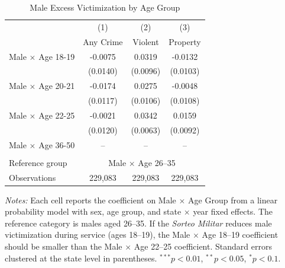\begin{table}[t]\begin{threeparttable}
\centering
\caption{Male Excess Victimization by Age Group}
\label{tab:age_profile}
\begin{tabular}{lccc}
\hline\hline
 & (1) & (2) & (3) \\
 & Any Crime & Violent & Property \\
\hline
\addlinespace
Male $\times$ Age 18-19 & -0.0075 & 0.0319 & -0.0132 \\
 & (0.0140) & (0.0096) & (0.0103) \\
\addlinespace
Male $\times$ Age 20-21 & -0.0174 & 0.0275 & -0.0048 \\
 & (0.0117) & (0.0106) & (0.0108) \\
\addlinespace
Male $\times$ Age 22-25 & -0.0021 & 0.0342 & 0.0159 \\
 & (0.0120) & (0.0063) & (0.0092) \\
\addlinespace
Male $\times$ Age 36-50 & -- & -- & -- \\
 &  &  &  \\
\addlinespace
Reference group & \multicolumn{3}{c}{Male $\times$ Age 26--35} \\
Observations & 229,083 & 229,083 & 229,083 \\
\hline\hline
\end{tabular}
\vspace{0.5em}\begin{tablenotes}[flushleft]
\small
\item \textit{Notes:} Each cell reports the coefficient on Male $\times$ Age Group from a linear probability model with sex, age group, and state $\times$ year fixed effects. The reference category is males aged 26--35. If the \textit{Sorteo Militar} reduces male victimization during service (ages 18--19), the Male $\times$ Age 18--19 coefficient should be smaller than the Male $\times$ Age 22--25 coefficient. Standard errors clustered at the state level in parentheses. $^{***}p<0.01$, $^{**}p<0.05$, $^{*}p<0.1$.
\end{tablenotes}
\end{threeparttable}\end{table}

